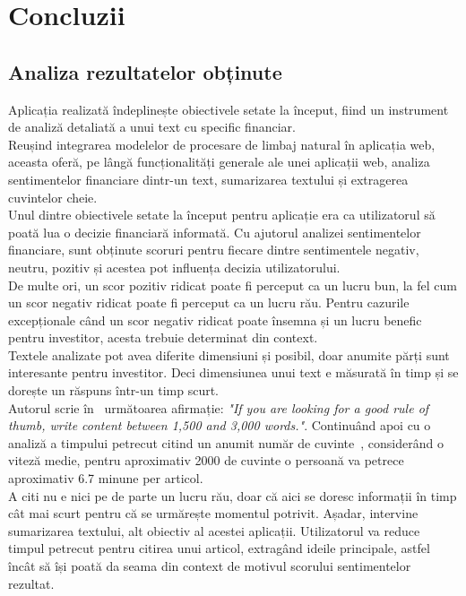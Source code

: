 \chapter{Concluzii}
\pagestyle{fancy}

\section{Analiza rezultatelor obținute}
Aplicația realizată îndeplinește obiectivele setate la început, fiind un instrument de analiză detaliată a unui text cu specific financiar.\\
Reușind integrarea modelelor de procesare de limbaj natural în aplicația web, aceasta oferă, pe lângă funcționalități generale ale unei aplicații web, analiza sentimentelor financiare dintr-un text, 
sumarizarea textului și extragerea cuvintelor cheie.\\

Unul dintre obiectivele setate la început pentru aplicație era ca utilizatorul să poată lua o decizie financiară informată. 
Cu ajutorul analizei sentimentelor financiare, sunt obținute scoruri pentru fiecare dintre sentimentele negativ, neutru, pozitiv și acestea pot influența decizia utilizatorului.\\
De multe ori, un scor pozitiv ridicat poate fi perceput ca un lucru bun, la fel cum un scor negativ ridicat poate fi perceput ca un lucru rău.
Pentru cazurile excepționale când un scor negativ ridicat poate însemna și un lucru benefic pentru investitor, acesta trebuie determinat din context.\\

Textele analizate pot avea diferite dimensiuni și posibil, doar anumite părți sunt interesante pentru investitor. Deci dimensiunea unui text e măsurată în timp și se dorește un răspuns într-un timp scurt.\\
Autorul scrie în~\cite{LengthOfAnArticle} următoarea afirmație: {\it "If you are looking for a good rule of thumb, write content between 1,500 and 3,000 words."}. Continuând apoi cu o analiză a timpului
petrecut citind un anumit număr de cuvinte~\cite{TimePerWords}, considerând o viteză medie, pentru aproximativ 2000 de cuvinte o persoană va petrece aproximativ 6.7 minune per articol.\\

A citi nu e nici pe de parte un lucru rău, doar că aici se doresc informații în timp cât mai scurt pentru că se urmărește momentul potrivit. Așadar, intervine sumarizarea textului, alt obiectiv al acestei aplicații.
Utilizatorul va reduce timpul petrecut pentru citirea unui articol, extragând ideile principale, astfel încât să își poată da seama din context de motivul scorului sentimentelor rezultat.\\

